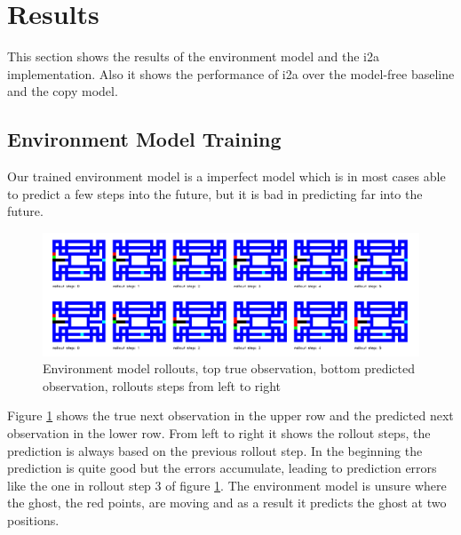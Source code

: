\section{Results}

This section shows the results of the environment model and the i2a implementation. Also it shows the performance of i2a over the model-free baseline and the copy model.


\subsection{Environment Model Training}

Our trained environment model is a imperfect model which is in most cases able to predict a few steps into the future, but it is bad in predicting far into the future.\\





\begin{figure}[H] 
  \centering   
  \includegraphics[width=\columnwidth]{./Images/env_model_rollouts.png}
  \caption{Environment model rollouts, top true observation, bottom predicted observation, rollouts steps from left to right} 
  \label{fig:environment_model_rollouts} 
\end{figure} 



Figure \ref{fig:environment_model_rollouts} shows the true next observation in the upper row and the predicted next observation in the lower row. From left to right it shows the rollout steps, the prediction is always based on the previous rollout step. In the beginning the prediction is quite good but the errors accumulate, leading to prediction errors like the one in rollout step 3 of figure \ref{fig:environment_model_rollouts}. The environment model is unsure where the ghost, the red points, are moving and as a result it predicts the ghost at two positions.\\



